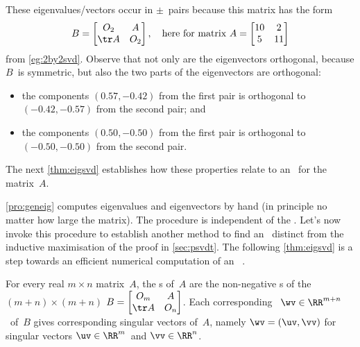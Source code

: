 \begin{example}
\begin{solution}
These eigenvalues\slash vectors occur in \(\pm\)~pairs because this matrix has the form
\begin{equation*}
B=\begin{bmatrix} O_2& A\\ \tr A&O_2\end{bmatrix},
\quad\text{here for matrix }
A=\begin{bmatrix} 10&2\\5&11 \end{bmatrix}
\end{equation*}
from \autoref{eg:2by2svd}.
Observe that not only are the eigenvectors orthogonal, because \(B\)~is symmetric, but also the two parts of the eigenvectors are orthogonal:  
\begin{itemize}
\item the components \((0.57,-0.42)\) from the first pair is orthogonal to \((-0.42,-0.57)\) from the second pair; and 
\item the components \((0.50,-0.50)\) from the first pair is orthogonal to \((-0.50,-0.50)\) from the second pair.
\end{itemize}
The next \autoref{thm:eigsvd} establishes how these properties relate to an \svd\ for the matrix~\(A\).
\end{solution}
\end{example}


\autoref{pro:geneig} computes eigenvalues and eigenvectors by hand (in principle no matter how large the matrix). 
The procedure is independent of the \svd.
Let's now invoke this procedure to establish another method to find an \svd\ distinct from the inductive maximisation of the proof in \autoref{sec:psvdt}. 
The following \autoref{thm:eigsvd} is a step towards an efficient numerical computation of an \svd\ \cite[p.234]{Trefethen1997}.



\begin{theorem} \label{thm:eigsvd}
For every real \(m\times n\) matrix~\(A\), the s of~\(A\) are the non-negative s of the \((m+n)\times(m+n)\)  \(B=\begin{bmatrix} O_m&A\\\tr A&O_n \end{bmatrix}\). 
Each corresponding ~\(\wv\in\RR^{m+n}\)\ of~\(B\) gives corresponding  singular vectors of~\(A\), namely \(\wv=(\uv,\vv)\) for singular vectors \(\uv\in\RR^m\)\ and \(\vv\in\RR^n\). 
\end{theorem}

